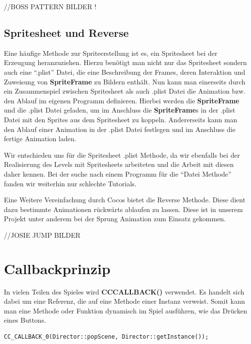 //BOSS PATTERN BILDER !


\subsection{Spritesheet und Reverse}

Eine häufige Methode zur Spriteerstellung ist es, ein Spritesheet bei der Erzeugung heranzuziehen. 
Hierzu benötigt man nicht nur das Spritesheet sondern auch eine “.plist” Datei, die eine Beschreibung der Frames, deren Interaktion und Zuweisung von \textbf{SpriteFrame} zu Bildern enthält. Nun kann man einerseits durch ein Zusammenspiel zwischen Spritesheet als auch .plist Datei die Animation bzw. den Ablauf im eigenen Programm definieren. Hierbei werden die \textbf{SpriteFrame} und die .plist Datei geladen, um im Anschluss die \textbf{SpriteFrame}s in der .plist Datei mit den Sprites aus dem Spritesheet zu koppeln. Andererseits kann man den Ablauf einer Animation in der .plist Datei festlegen und im Anschluss die fertige Animation laden. 

Wir entschieden uns für die Spritesheet .plist Methode, da wir ebenfalls bei der Realisierung des Levels mit Spritesheets arbeiteten und die Arbeit mit diesen daher kennen. Bei der suche nach einem Programm für die “Datei Methode” fanden wir weiterhin nur schlechte Tutorials. 

Eine Weitere Vereinfachung durch Cocos bietet die Reverse Methode. Diese dient dazu bestimmte Animationen rückwärts ablaufen zu lassen. Diese ist in unserem Projekt unter anderem bei der Sprung Animation zum Einsatz gekommen. 

//JOSIE JUMP BILDER



\section{Callbackprinzip}\label{sec:2_Callbackprinzip}

In vielen Teilen des Spieles wird \textbf{CC\textunderscore CALLBACK()} verwendet. Es handelt sich dabei um eine Referenz, die auf eine Methode einer Instanz verweist. Somit kann man eine Methode oder Funktion dynamisch im Spiel ausführen, wie das Drücken eines Buttons.

\begin{lstlisting}[style=singleline]
CC_CALLBACK_0(Director::popScene, Director::getInstance());
\end{lstlisting}

